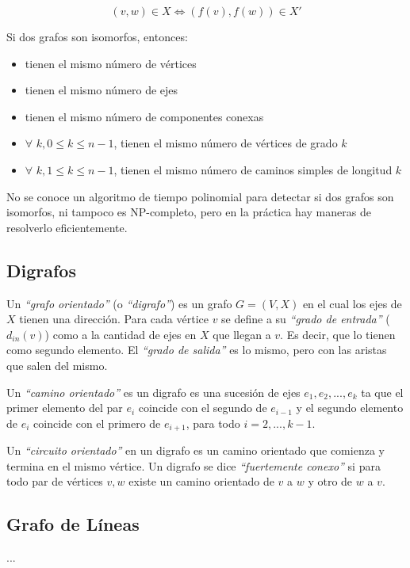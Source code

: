 \begin{figure}[h]
\[ (v,w) \in X \Longleftrightarrow (f(v), f(w)) \in X' \]
\end{figure}

Si dos grafos son isomorfos, entonces:

\begin{itemize}
\item tienen el mismo n\'umero de v\'ertices
\item tienen el mismo n\'umero de ejes
\item tienen el mismo n\'umero de componentes conexas
\item $\forall$ $k, 0 \leq k \leq n-1$, tienen el mismo n\'umero de v\'ertices de grado $k$
\item $\forall$ $k, 1 \leq k \leq n-1$, tienen el mismo n\'umero de caminos simples de longitud $k$
\end{itemize}

No se conoce un algoritmo de tiempo polinomial para detectar si dos grafos son isomorfos, ni tampoco es NP-completo, pero en la pr\'actica hay maneras de resolverlo eficientemente.

\newpage
\subsection{Digrafos}

Un \emph{``grafo orientado''} (o \emph{``digrafo''}) es un grafo $G=(V,X)$ en el cual los ejes de $X$ tienen una direcci\'on. Para cada v\'ertice $v$ se define a su \emph{``grado de entrada''} ($d_{in}(v)$) como a la cantidad de ejes en $X$ que llegan a $v$. Es decir, que lo tienen como segundo elemento. El \emph{``grado de salida''} es lo mismo, pero con las aristas que salen del mismo.

Un \emph{``camino orientado''} es un digrafo es una sucesi\'on de ejes $e_1, e_2, ..., e_k$ ta que el primer elemento del par $e_i$ coincide con el segundo de $e_{i-1}$ y el segundo elemento de $e_i$ coincide con el primero de $e_{i+1}$, para todo $i = 2, ..., k-1$.

Un \emph{``circuito orientado''} en un digrafo es un camino orientado que comienza y termina en el mismo v\'ertice. Un digrafo se dice \emph{``fuertemente conexo''} si para todo par de v\'ertices $v,w$ existe un camino orientado de $v$ a $w$ y otro de $w$ a $v$.

\subsection{Grafo de L\'ineas}

...